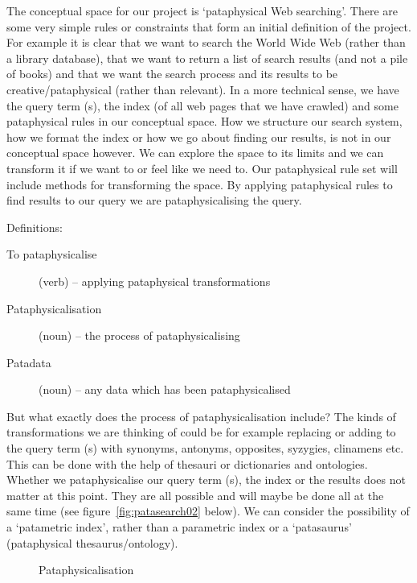 The conceptual space for our project is `pataphysical Web searching'. There are some very simple rules or constraints that form an initial definition of the project. For example it is clear that we want to search the World Wide Web (rather than a library database), that we want to return a list of search results (and not a pile of books) and that we want the search process and its results to be creative/pataphysical (rather than relevant).  In a more technical sense, we have the query term (s), the index (of all web pages that we have crawled) and some pataphysical rules in our conceptual space. How we structure our search system, how we format the index or how we go about finding our results, is not in our conceptual space however. We can explore the space to its limits and we can transform it if we want to or feel like we need to. Our pataphysical rule set will include methods for transforming the space. By applying pataphysical rules to find results to our query we are pataphysicalising the query.

Definitions:
\begin{description}
  \item [To pataphysicalise] (verb) – applying pataphysical transformations
  \item [Pataphysicalisation] (noun) – the process of pataphysicalising
  \item [Patadata] (noun) – any data which has been pataphysicalised
\end{description}

But what exactly does the process of pataphysicalisation include? The kinds of transformations we are thinking of could be for example replacing or adding to the query term (s) with synonyms, antonyms, opposites, syzygies, clinamens etc. This can be done with the help of thesauri or dictionaries and ontologies. Whether we pataphysicalise our query term (s), the index or the results does not matter at this point. They are all possible and will maybe be done all at the same time (see figure~\ref{fig:patasearch02} below). We can consider the possibility of a `patametric index', rather than a parametric index or a `patasaurus' (pataphysical thesaurus/ontology).

\begin{figure}[htb] %
  \centering
  \def\svgwidth{\columnwidth}
  
\caption[Pataphysicalisation]{Pataphysicalisation}
\label{fig:patasearch02f}
\end{figure}

